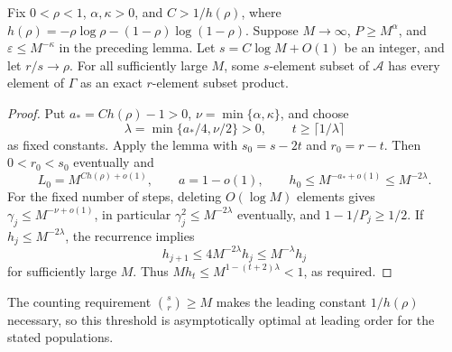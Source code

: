 \begin{corollary}
\label{cor:fixed-weight-entropy-threshold}
Fix $0<\rho<1$, $\alpha,\kappa>0$, and
$C>1/h(\rho)$, where
$h(\rho)=-\rho\log\rho-(1-\rho)\log(1-\rho)$.
Suppose $M\to\infty$, $P\ge M^\alpha$, and
$\varepsilon\le M^{-\kappa}$ in the preceding lemma.
Let $s=C\log M+O(1)$ be an integer, and let $r/s\to\rho$.
For all sufficiently large $M$, some $s$-element subset of
$\mathcal A$ has every element of $\Gamma$ as an exact $r$-element
subset product.
\end{corollary}
\begin{proof}
Put $a_*=Ch(\rho)-1>0$, $\nu=\min\{\alpha,\kappa\}$, and choose
\[
 \lambda=\min\{a_*/4,\nu/2\}>0,
 \qquad t\ge\lceil1/\lambda\rceil
\]
as fixed constants.  Apply the lemma with
$s_0=s-2t$ and $r_0=r-t$.  Then $0<r_0<s_0$ eventually and
\[
 L_0=M^{Ch(\rho)+o(1)},\qquad a=1-o(1),\qquad
 h_0\le M^{-a_*+o(1)}\le M^{-2\lambda}.
\]
For the fixed number of steps, deleting $O(\log M)$ elements gives
$\gamma_j\le M^{-\nu+o(1)}$, in particular
$\gamma_j^2\le M^{-2\lambda}$ eventually, and $1-1/P_j\ge1/2$.
If $h_j\le M^{-2\lambda}$, the recurrence implies
\[
 h_{j+1}\le4M^{-2\lambda}h_j\le M^{-\lambda}h_j
\]
for sufficiently large $M$.  Thus
$Mh_t\le M^{1-(t+2)\lambda}<1$, as required.
\end{proof}

The counting requirement $\binom{s}{r}\ge M$ makes the leading
constant $1/h(\rho)$ necessary, so this threshold is asymptotically
optimal at leading order for the stated populations.

